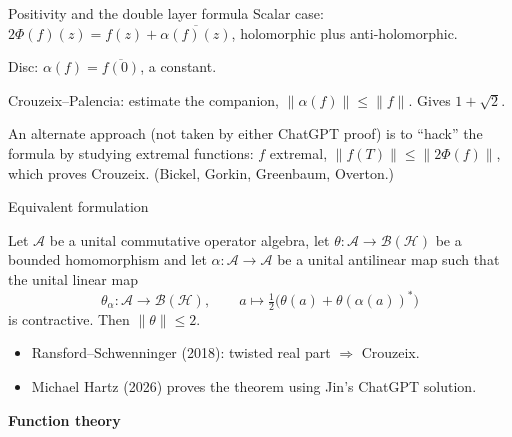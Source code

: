 \documentclass[14pt]{beamer}
\newcommand{\Hil}{\mathcal{H}}
\newcommand{\B}{\mathcal{B}}
\newcommand{\A}{\mathcal{A}}
\newcommand{\norm}[1]{\lVert #1\rVert}
\begin{document}
\begin{frame}{Positivity and the double layer formula}
  Scalar case: $2\Phi(f)(z)=f(z)+\overline{\alpha(f)(z)}$, holomorphic plus anti-holomorphic.

  \medskip
  Disc: $\alpha(f)=\overline{f(0)}$, a constant.

  \medskip
  Crouzeix--Palencia: estimate the companion, $\norm{\alpha(f)}\le\norm{f}$. Gives $1+\sqrt2$.

  \medskip
  An alternate approach (not taken by either ChatGPT proof) is to ``hack'' the formula by studying extremal functions: $f$ extremal, $\norm{f(T)}\le\norm{2\Phi(f)}$, which proves Crouzeix. (Bickel, Gorkin, Greenbaum, Overton.)
\end{frame}

\begin{frame}{Equivalent formulation}
  \begin{theorem}
    Let $\A$ be a unital commutative operator algebra, let $\theta:\A\to\B(\Hil)$ be a bounded homomorphism and let $\alpha:\A\to\A$ be a unital antilinear map such that the unital linear map
    \[
      \theta_\alpha:\A\to\B(\Hil),\qquad a\mapsto\tfrac12\big(\theta(a)+\theta(\alpha(a))^*\big)
    \]
    is contractive. Then $\norm{\theta}\le2$.
  \end{theorem}
  \begin{itemize}
    \item Ransford--Schwenninger (2018): twisted real part $\Rightarrow$ Crouzeix.
    \item Michael Hartz (2026) proves the theorem using Jin's ChatGPT solution.
  \end{itemize}
\end{frame}

\begin{frame}
  \begin{center}
    {\LARGE\bfseries Function theory}
  \end{center}
\end{frame}
\note{}
\end{document}
